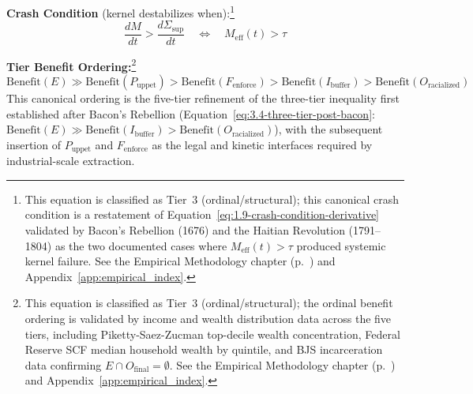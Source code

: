 \begin{definition}
\textbf{Crash Condition} (kernel destabilizes when):\footnote{This equation is classified as Tier~3 (ordinal/structural); this canonical crash condition is a restatement of Equation~\ref{eq:1.9-crash-condition-derivative} validated by Bacon's Rebellion (1676) and the Haitian Revolution (1791--1804) as the two documented cases where $M_{\text{eff}}(t) > \tau$ produced systemic kernel failure. See the Empirical Methodology chapter (p.~\pageref{ch:empirical_methodology}) and Appendix~\ref{app:empirical_index}.}
\begin{equation}\label{eq:10.8-crash-condition-canonical}
\frac{dM}{dt} > \frac{d\Sigma_{\text{sup}}}{dt} \quad \Longleftrightarrow \quad M_{\text{eff}}(t) > \tau
\end{equation}

\textbf{Tier Benefit Ordering:}\footnote{This equation is classified as Tier~3 (ordinal/structural); the ordinal benefit ordering is validated by income and wealth distribution data across the five tiers, including Piketty-Saez-Zucman top-decile wealth concentration, Federal Reserve SCF median household wealth by quintile, and BJS incarceration data confirming $E \cap O_{\text{final}} = \emptyset$. See the Empirical Methodology chapter (p.~\pageref{ch:empirical_methodology}) and Appendix~\ref{app:empirical_index}.}
\begin{equation}\label{eq:10.9-tier-benefit-ordering-canonical}
\text{Benefit}(E) \gg \text{Benefit}(P_{\text{uppet}}) > \text{Benefit}(F_{\text{enforce}}) > \text{Benefit}(I_{\text{buffer}}) > \text{Benefit}(O_{\text{racialized}})
\end{equation}
This canonical ordering is the five-tier refinement of the three-tier inequality first established after Bacon's Rebellion (Equation~\ref{eq:3.4-three-tier-post-bacon}: $\text{Benefit}(E) \gg \text{Benefit}(I_{\text{buffer}}) > \text{Benefit}(O_{\text{racialized}})$), with the subsequent insertion of $P_{\text{uppet}}$ and $F_{\text{enforce}}$ as the legal and kinetic interfaces required by industrial-scale extraction.


\end{definition}
